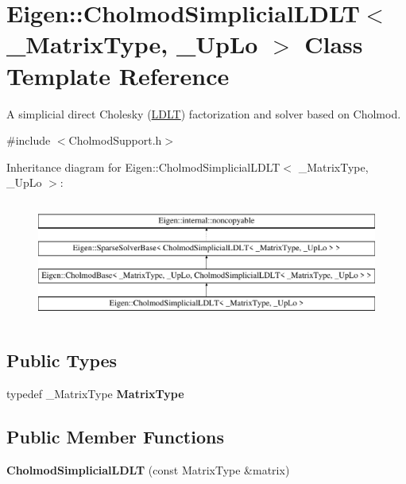 \hypertarget{class_eigen_1_1_cholmod_simplicial_l_d_l_t}{}\section{Eigen\+::Cholmod\+Simplicial\+L\+D\+LT$<$ \+\_\+\+Matrix\+Type, \+\_\+\+Up\+Lo $>$ Class Template Reference}
\label{class_eigen_1_1_cholmod_simplicial_l_d_l_t}


A simplicial direct Cholesky (\mbox{\hyperlink{class_eigen_1_1_l_d_l_t}{L\+D\+LT}}) factorization and solver based on Cholmod.  




{\ttfamily \#include $<$Cholmod\+Support.\+h$>$}

Inheritance diagram for Eigen\+::Cholmod\+Simplicial\+L\+D\+LT$<$ \+\_\+\+Matrix\+Type, \+\_\+\+Up\+Lo $>$\+:\begin{figure}[H]
\begin{center}
\leavevmode
\includegraphics[height=4.000000cm]{class_eigen_1_1_cholmod_simplicial_l_d_l_t}
\end{center}
\end{figure}
\subsection*{Public Types}
\begin{DoxyCompactItemize}
\item 
\mbox{\label{class_eigen_1_1_cholmod_simplicial_l_d_l_t_a25eb39d9c0d5baef08fda965444cb27e}} 
typedef \+\_\+\+Matrix\+Type {\bfseries Matrix\+Type}
\end{DoxyCompactItemize}
\subsection*{Public Member Functions}
\begin{DoxyCompactItemize}
\item 
\mbox{\label{class_eigen_1_1_cholmod_simplicial_l_d_l_t_a98280cac66601a0ef98d28de1a430061}} 
{\bfseries Cholmod\+Simplicial\+L\+D\+LT} (const Matrix\+Type \&matrix)
\end{DoxyCompactItemize}
